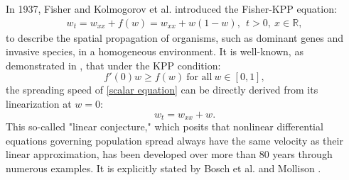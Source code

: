 \documentclass[11pt,a4paper]{article}
\numberwithin{equation}{section}
\numberwithin{figure}{section}
\newcommand\beaa{\begin{eqnarray*}}
\newcommand\eeaa{\end{eqnarray*}}
\begin{document}
In 1937, Fisher \cite{Fisher} and Kolmogorov et al. \cite{KPP} introduced the Fisher-KPP equation:
\beaa%
w_t=w_{xx}+f(w)=w_{xx}+w(1-w),\ \ t>0,\ x\in\mathbb{R},
\eeaa
to describe the spatial propagation of organisms, such as dominant genes and invasive species, in a homogeneous environment. It is well-known, as demonstrated in \cite{Fisher, KPP}, that under the KPP condition:
\begin{equation}\label{kpp condition}
f'(0)w\geq f(w)\ \text{for all}\ w\in[0,1],
\end{equation}
the spreading speed of \eqref{scalar equation} can be directly derived from its linearization at $w=0$:
$$w_t=w_{xx}+w.$$
This so-called "linear conjecture," which posits that nonlinear differential equations governing population spread always have the same velocity as their linear approximation, has been developed over more than 80 years through numerous examples. It is explicitly stated by Bosch et al. \cite{Bosch Metz Diekmann} and Mollison \cite{Mollison}.
\end{document}
